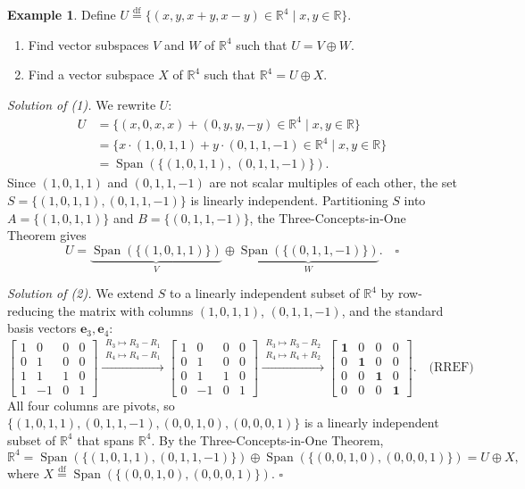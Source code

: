 \documentclass[11pt, a4paper, notitlepage]{report}
\theoremstyle{definition}
\newtheorem{example}[theorem]{Example}
\theoremstyle{remark}
\begin{document}
\begin{example}\label{ex:decompose-U}
Define $U \stackrel{\mathrm{df}}{=} \{(x, y, x+y, x-y) \in \mathbb{R}^4 \mid x, y \in \mathbb{R}\}$.
\begin{enumerate}
  \item Find vector subspaces $V$ and $W$ of $\mathbb{R}^4$ such that $U = V \oplus W$.
  \item Find a vector subspace $X$ of $\mathbb{R}^4$ such that $\mathbb{R}^4 = U \oplus X$.
\end{enumerate}

\emph{Solution of (1).} We rewrite $U$:
\begin{align*}
  U &= \{(x,0,x,x) + (0,y,y,-y) \in \mathbb{R}^4 \mid x,y \in \mathbb{R}\} \\
    &= \{x\cdot(1,0,1,1) + y\cdot(0,1,1,-1) \in \mathbb{R}^4 \mid x,y \in \mathbb{R}\} \\
    &= \operatorname{Span}(\{(1,0,1,1),\,(0,1,1,-1)\}).
\end{align*}
Since $(1,0,1,1)$ and $(0,1,1,-1)$ are not scalar multiples of each other, the set $S = \{(1,0,1,1),(0,1,1,-1)\}$ is linearly independent. Partitioning $S$ into $A = \{(1,0,1,1)\}$ and $B = \{(0,1,1,-1)\}$, the Three-Concepts-in-One Theorem gives
\[
  U = \underbrace{\operatorname{Span}(\{(1,0,1,1)\})}_{V} \oplus \underbrace{\operatorname{Span}(\{(0,1,1,-1)\})}_{W}. \quad \square
\]

\emph{Solution of (2).} We extend $S$ to a linearly independent subset of $\mathbb{R}^4$ by row-reducing the matrix with columns $(1,0,1,1)$, $(0,1,1,-1)$, and the standard basis vectors $\mathbf{e}_3, \mathbf{e}_4$:
\[
  \begin{bmatrix}1&0&0&0\\0&1&0&0\\1&1&1&0\\1&-1&0&1\end{bmatrix}
  \xrightarrow{\substack{R_3\mapsto R_3-R_1\\R_4\mapsto R_4-R_1}}
  \begin{bmatrix}1&0&0&0\\0&1&0&0\\0&1&1&0\\0&-1&0&1\end{bmatrix}
  \xrightarrow{\substack{R_3\mapsto R_3-R_2\\R_4\mapsto R_4+R_2}}
  \begin{bmatrix}\mathbf{1}&0&0&0\\0&\mathbf{1}&0&0\\0&0&\mathbf{1}&0\\0&0&0&\mathbf{1}\end{bmatrix}. \quad \text{(RREF)}
\]
All four columns are pivots, so $\{(1,0,1,1),(0,1,1,-1),(0,0,1,0),(0,0,0,1)\}$ is a linearly independent subset of $\mathbb{R}^4$ that spans $\mathbb{R}^4$. By the Three-Concepts-in-One Theorem,
\[
  \mathbb{R}^4 = \operatorname{Span}(\{(1,0,1,1),(0,1,1,-1)\}) \oplus \operatorname{Span}(\{(0,0,1,0),(0,0,0,1)\}) = U \oplus X,
\]
where $X \stackrel{\mathrm{df}}{=} \operatorname{Span}(\{(0,0,1,0),(0,0,0,1)\})$. $\square$
\end{example}
\end{document}
